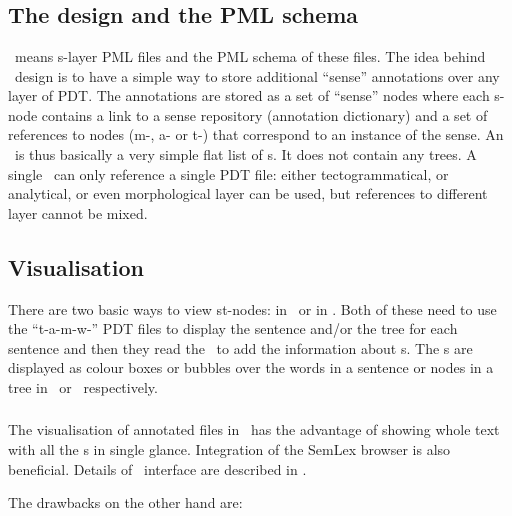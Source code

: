 \section{\sdata}
\subsection{The design and the PML schema}
\sdata\ means s-layer PML files and the PML schema of these files. The idea behind \sdata\ design is to have a simple way to store additional ``sense'' annotations over any layer of PDT. The annotations are stored as a set of ``sense'' nodes where each s-node contains a link to a sense repository (annotation dictionary) and a set of references to nodes (m-, a- or t-) that correspond to an instance of the sense. An \sf\ is thus basically a very simple flat list of \sn{}s. It does not contain any trees. A single \sf\ can only reference a single PDT file: either tectogrammatical, or analytical, or even morphological layer can be used, but references to different layer cannot be mixed.

\subsection{Visualisation}
There are two basic ways to view st-nodes: in \seman\ or in \tred. Both of these need to use the ``t-a-m-w-'' PDT files to display the sentence and/or the tree for each sentence and then they read the \stf\ to add the information about \stn{}s. The \stn{}s are displayed as colour boxes or bubbles over the words in a sentence or nodes in a tree in \seman\ or \tred\ respectively.

\subsubsection{\seman}
The visualisation of annotated files in \seman\ has the advantage of showing whole text with all the \mwe{}s in single glance. Integration of the SemLex browser is also beneficial. Details of \seman\ interface are described in . 

The drawbacks on the other hand are:
